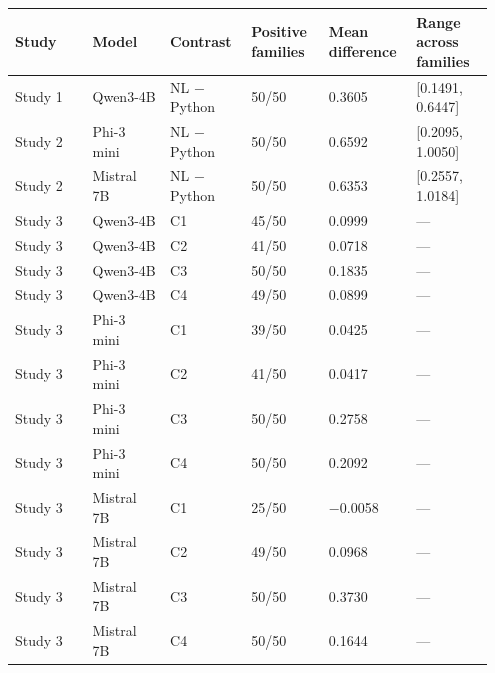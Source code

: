 \documentclass[sn-mathphys-num]{sn-jnl}
\begin{document}
\begin{table}[!htbp]
\centering\scriptsize
\begin{tabular}{|p{0.158\linewidth}|p{0.158\linewidth}|p{0.158\linewidth}|p{0.158\linewidth}|p{0.158\linewidth}|p{0.158\linewidth}|}
\hline
Study & Model & Contrast & Positive families & Mean difference & Range across families \\ \hline
Study 1 & Qwen3-4B & NL $-$ Python & 50/50 & 0.3605 & [0.1491, 0.6447] \\ \hline
Study 2 & Phi-3 mini & NL $-$ Python & 50/50 & 0.6592 & [0.2095, 1.0050] \\ \hline
Study 2 & Mistral 7B & NL $-$ Python & 50/50 & 0.6353 & [0.2557, 1.0184] \\ \hline
Study 3 & Qwen3-4B & C1 & 45/50 & 0.0999 & — \\ \hline
Study 3 & Qwen3-4B & C2 & 41/50 & 0.0718 & — \\ \hline
Study 3 & Qwen3-4B & C3 & 50/50 & 0.1835 & — \\ \hline
Study 3 & Qwen3-4B & C4 & 49/50 & 0.0899 & — \\ \hline
Study 3 & Phi-3 mini & C1 & 39/50 & 0.0425 & — \\ \hline
Study 3 & Phi-3 mini & C2 & 41/50 & 0.0417 & — \\ \hline
Study 3 & Phi-3 mini & C3 & 50/50 & 0.2758 & — \\ \hline
Study 3 & Phi-3 mini & C4 & 50/50 & 0.2092 & — \\ \hline
Study 3 & Mistral 7B & C1 & 25/50 & $-$0.0058 & — \\ \hline
Study 3 & Mistral 7B & C2 & 49/50 & 0.0968 & — \\ \hline
Study 3 & Mistral 7B & C3 & 50/50 & 0.3730 & — \\ \hline
Study 3 & Mistral 7B & C4 & 50/50 & 0.1644 & — \\ \hline
\end{tabular}
\end{table}
\end{document}
